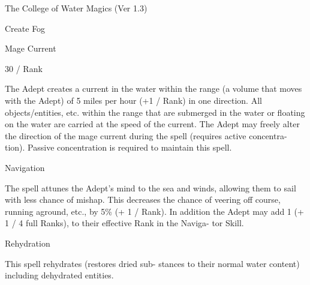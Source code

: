 \begin{Chapter}{The College of Water Magics (Ver 1.3)}
\begin{spell}[G-3]{Create Fog }
\begin{effects}
\end{effects}
\end{spell}

\begin{spell}[G-4]{Mage Current }

30 / Rank 
\begin{effects}
 The  Adept  creates  a  current  in  the  water 
within  the  range  (a  volume  that  moves  with  the 
Adept)  of  5  miles  per  hour  (+1  /  Rank)  in  one 
direction. All objects/entities, etc. within the range 
that  are  submerged  in  the  water  or  floating  on  the 
water  are  carried  at  the  speed  of  the  current.  The 
Adept  may  freely  alter  the  direction  of  the  mage 
current during the spell (requires active concentra-
tion). Passive concentration is required to maintain 
this spell. 

\end{effects}
\end{spell}

\begin{spell}[G-5]{Navigation }

\begin{effects}
 The  spell  attunes  the  Adept’s  mind  to  the 
sea  and  winds,  allowing  them  to  sail  with  less 
chance  of  mishap.  This  decreases  the  chance  of 
veering off course, running aground, etc., by 5\% (+ 
1 / Rank). In addition the Adept may add 1 (+ 1 / 4 
full  Ranks),  to their  effective  Rank  in  the  Naviga-
tor Skill. 

\end{effects}
\end{spell}

\begin{spell}[G-6]{Rehydration }

\begin{effects}
 This  spell  rehydrates  (restores  dried  sub-
stances  to  their  normal  water  content)  including 
dehydrated entities. 

\end{effects}
\end{spell}


\end{Chapter}
